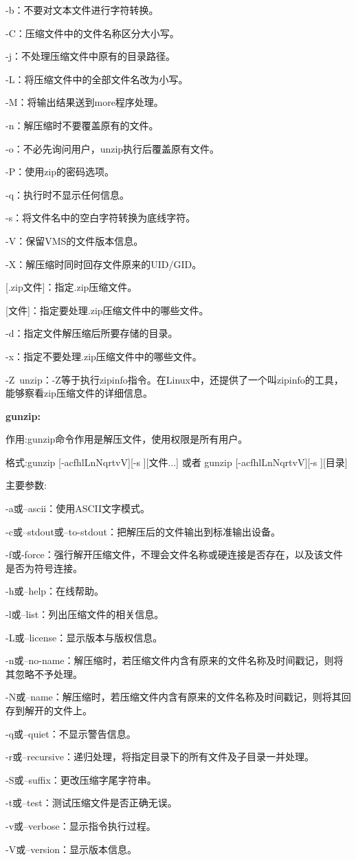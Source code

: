 -b：不要对文本文件进行字符转换。

-C：压缩文件中的文件名称区分大小写。

-j：不处理压缩文件中原有的目录路径。

-L：将压缩文件中的全部文件名改为小写。

-M：将输出结果送到more程序处理。

-n：解压缩时不要覆盖原有的文件。

-o：不必先询问用户，unzip执行后覆盖原有文件。

-P：使用zip的密码选项。

-q：执行时不显示任何信息。

-s：将文件名中的空白字符转换为底线字符。

-V：保留VMS的文件版本信息。

-X：解压缩时同时回存文件原来的UID/GID。

[.zip文件]：指定.zip压缩文件。

[文件]：指定要处理.zip压缩文件中的哪些文件。

-d：指定文件解压缩后所要存储的目录。

-x：指定不要处理.zip压缩文件中的哪些文件。

-Z\ unzip：-Z等于执行zipinfo指令。在Linux中，还提供了一个叫zipinfo的工具，能够察看zip压缩文件的详细信息。

\textbf{gunzip:}

作用:gunzip命令作用是解压文件，使用权限是所有用户。

格式:gunzip [-acfhlLnNqrtvV][-s ][文件...]
或者
gunzip [-acfhlLnNqrtvV][-s ][目录]

主要参数:

-a或--ascii：使用ASCII文字模式。

-c或--stdout或--to-stdout：把解压后的文件输出到标准输出设备。

-f或-force：强行解开压缩文件，不理会文件名称或硬连接是否存在，以及该文件是否为符号连接。

-h或--help：在线帮助。

-l或--list：列出压缩文件的相关信息。

-L或--license：显示版本与版权信息。

-n或--no-name：解压缩时，若压缩文件内含有原来的文件名称及时间戳记，则将其忽略不予处理。

-N或--name：解压缩时，若压缩文件内含有原来的文件名称及时间戳记，则将其回存到解开的文件上。

-q或--quiet：不显示警告信息。

-r或--recursive：递归处理，将指定目录下的所有文件及子目录一并处理。

-S或--suffix：更改压缩字尾字符串。

-t或--test：测试压缩文件是否正确无误。

-v或--verbose：显示指令执行过程。

-V或--version：显示版本信息。

